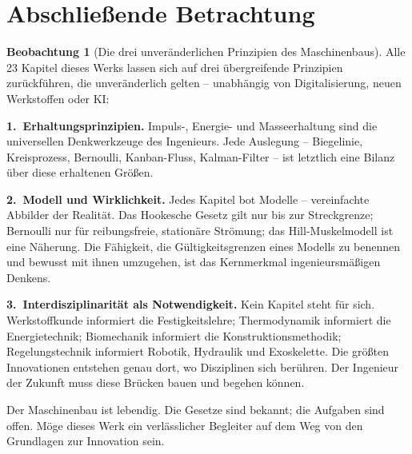 ﻿\documentclass[a4paper,12pt]{report}
\theoremstyle{definition}
\newtheorem{beobachtung}{Beobachtung}
\begin{document}
\section{Abschließende Betrachtung}

\begin{beobachtung}[Die drei unveränderlichen Prinzipien des Maschinenbaus]
Alle 23 Kapitel dieses Werks lassen sich auf drei übergreifende
Prinzipien zurückführen, die unveränderlich gelten -- unabhängig von
Digitalisierung, neuen Werkstoffen oder KI:

\medskip
\noindent\textbf{1.~Erhaltungsprinzipien.}
Impuls-, Energie- und Masseerhaltung sind die universellen
Denkwerkzeuge des Ingenieurs. Jede Auslegung -- Biegelinie, Kreisprozess,
Bernoulli, Kanban-Fluss, Kalman-Filter -- ist letztlich eine Bilanz
über diese erhaltenen Größen.

\medskip
\noindent\textbf{2.~Modell und Wirklichkeit.}
Jedes Kapitel bot Modelle -- vereinfachte Abbilder der Realität.
Das Hookesche Gesetz gilt nur bis zur Streckgrenze;
Bernoulli nur für reibungsfreie, stationäre Strömung;
das Hill-Muskelmodell ist eine Näherung.
Die Fähigkeit, die Gültigkeitsgrenzen eines Modells zu benennen
und bewusst mit ihnen umzugehen, ist das Kernmerkmal ingenieursmäßigen Denkens.

\medskip
\noindent\textbf{3.~Interdisziplinarität als Notwendigkeit.}
Kein Kapitel steht für sich. Werkstoffkunde informiert
die Festigkeitslehre; Thermodynamik informiert die Energietechnik;
Biomechanik informiert die Konstruktionsmethodik; Regelungstechnik
informiert Robotik, Hydraulik und Exoskelette. Die größten Innovationen
entstehen genau dort, wo Disziplinen sich berühren.
Der Ingenieur der Zukunft muss diese Brücken bauen und begehen können.

\medskip
Der Maschinenbau ist lebendig. Die Gesetze sind bekannt;
die Aufgaben sind offen. Möge dieses Werk ein verlässlicher
Begleiter auf dem Weg von den Grundlagen zur Innovation sein.
\end{beobachtung}
\end{document}

